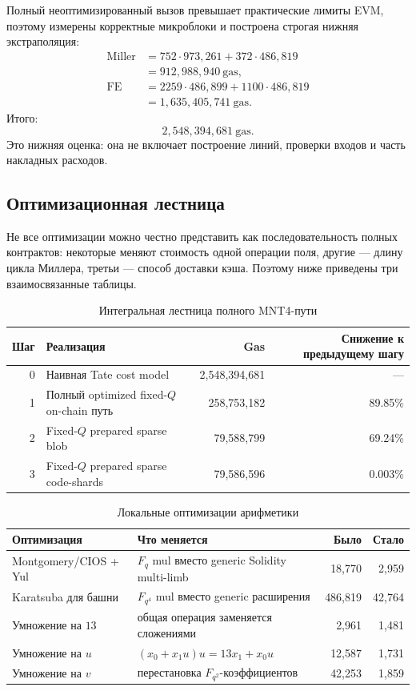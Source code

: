 \documentclass[12pt,a4paper]{article}
\newcommand{\Gas}{\mathrm{gas}}
\begin{document}
Полный неоптимизированный вызов превышает практические лимиты EVM, поэтому
измерены корректные микроблоки и построена строгая нижняя экстраполяция:
\[
\begin{aligned}
    \text{Miller} &=
    752\cdot 973{,}261+372\cdot 486{,}819\\
    &=912{,}988{,}940\ \Gas,\\
    \text{FE} &=
    2259\cdot 486{,}899+1100\cdot 486{,}819\\
    &=1{,}635{,}405{,}741\ \Gas.
\end{aligned}
\]
Итого:
\[
    2{,}548{,}394{,}681\ \Gas.
\]
Это нижняя оценка: она не включает построение линий, проверки входов и часть
накладных расходов.

\subsection{Оптимизационная лестница}

Не все оптимизации можно честно представить как последовательность полных
контрактов: некоторые меняют стоимость одной операции поля, другие ---
длину цикла Миллера, третьи --- способ доставки кэша. Поэтому ниже приведены
три взаимосвязанные таблицы.

\begin{table}[htbp]
\centering
\caption{Интегральная лестница полного MNT4-пути}
\small
\begin{tabularx}{\linewidth}{r Y r r}
\toprule
Шаг & Реализация & Gas & Снижение к предыдущему шагу \\
 & Наивная Tate cost model & 2,548,394,681 & --- \\
1 & Полный optimized fixed-$Q$ on-chain путь & 258,753,182 & 89.85\% \\
2 & Fixed-$Q$ prepared sparse blob & 79,588,799 & 69.24\% \\
3 & Fixed-$Q$ prepared sparse code-shards & 79,586,596 & 0.003\% \\
\bottomrule
\end{tabularx}
\end{table}

\begin{table}[htbp]
\centering
\caption{Локальные оптимизации арифметики}
\small
\begin{tabularx}{\linewidth}{Y Y r r}
\toprule
Оптимизация & Что меняется & Было & Стало \\
\midrule
Montgomery/CIOS + Yul & $F_q$ mul вместо generic Solidity multi-limb &
18,770 & 2,959 \\
Karatsuba для башни & $F_{q^4}$ mul вместо generic расширения &
486,819 & 42,764 \\
Умножение на $13$ & общая операция заменяется сложениями &
2,961 & 1,481 \\
Умножение на $u$ & $(x_0+x_1u)u=13x_1+x_0u$ &
12,587 & 1,731 \\
Умножение на $v$ & перестановка $F_{q^2}$-коэффициентов &
42,253 & 1,859 \\
\bottomrule
\end{tabularx}
\end{table}
\end{document}
